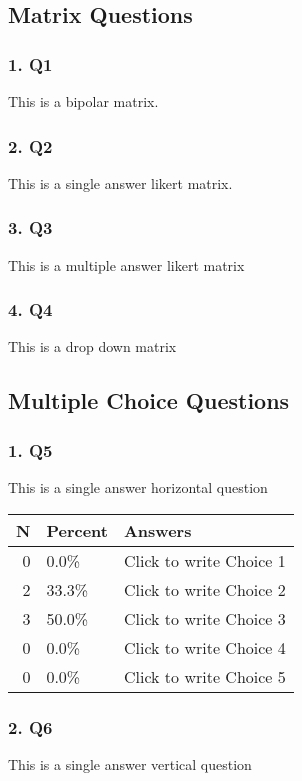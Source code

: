 \documentclass{article}\usepackage[]{graphicx}\usepackage[]{color}
\begin{document}
\subsection*{Matrix Questions}
\subsubsection*{1. Q1}
This is a bipolar matrix.

\hfill \break \hfill \break
\subsubsection*{2. Q2}
This is a single answer likert matrix.

\hfill \break \hfill \break
\subsubsection*{3. Q3}
This is a multiple answer likert matrix

\hfill \break \hfill \break
\subsubsection*{4. Q4}
This is a drop down matrix

\hfill \break \hfill \break
\subsection*{Multiple Choice Questions}
\subsubsection*{1. Q5}
This is a single answer horizontal question

\begin{tabular}{r|l|l}
\hline
N & Percent & Answers\\
\hline
0 & 0.0\% & Click to write Choice 1\\
\hline
2 & 33.3\% & Click to write Choice 2\\
\hline
3 & 50.0\% & Click to write Choice 3\\
\hline
0 & 0.0\% & Click to write Choice 4\\
\hline
0 & 0.0\% & Click to write Choice 5\\
\hline
\end{tabular}


\hfill \break \hfill \break
\subsubsection*{2. Q6}
This is a single answer vertical question
\end{document}
